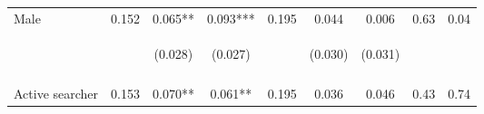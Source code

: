 \begin{tabular}{lcccccccc}
\noalign{\smallskip}Male & 0.152 & 0.065** & 0.093*** & 0.195 & 0.044 & 0.006 & 0.63 & 0.04\\
 & \begin{footnotesize}\end{footnotesize} & \begin{footnotesize}(0.028)\end{footnotesize} & \begin{footnotesize}(0.027)\end{footnotesize} & \begin{footnotesize}\end{footnotesize} & \begin{footnotesize}(0.030)\end{footnotesize} & \begin{footnotesize}(0.031)\end{footnotesize} & \begin{footnotesize}\end{footnotesize} & \begin{footnotesize}\end{footnotesize}\\
 & \begin{footnotesize}\end{footnotesize} & \begin{footnotesize}[0.021]\end{footnotesize} & \begin{footnotesize}[0.004]\end{footnotesize} & \begin{footnotesize}\end{footnotesize} & \begin{footnotesize}[0.505]\end{footnotesize} & \begin{footnotesize}[1.000]\end{footnotesize} & \begin{footnotesize}\end{footnotesize} & \begin{footnotesize}\end{footnotesize}\\
\noalign{\smallskip}Active searcher & 0.153 & 0.070** & 0.061** & 0.195 & 0.036 & 0.046 & 0.43 & 0.74\\

\end{tabular}
